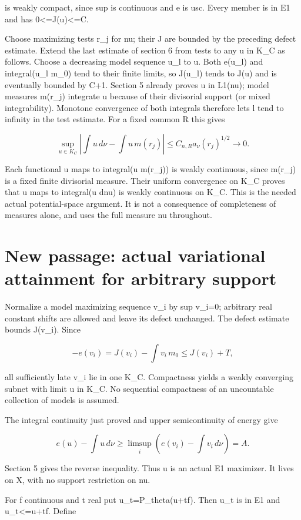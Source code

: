 \documentclass[11pt]{article}
\begin{document}
is weakly compact, since sup is continuous and e is usc. Every member is in E1 and has 0\textless{}=J(u)\textless{}=C.

Choose maximizing tests r\_j for nu; their J are bounded by the preceding defect estimate. Extend the last estimate of section 6 from tests to any u in K\_C as follows. Choose a decreasing model sequence u\_l to u. Both e(u\_l) and integral(u\_l m\_0) tend to their finite limits, so J(u\_l) tends to J(u) and is eventually bounded by C+1. Section 5 already proves u in L1(nu); model measures m(r\_j) integrate u because of their divisorial support (or mixed integrability). Monotone convergence of both integrals therefore lets l tend to infinity in the test estimate. For a fixed common R this gives

\[
\sup_{u\in K_C}\left|\int u\,d\nu-\int u\,m(r_j)\right|
\leq C_{n,R}a_\nu(r_j)^{1/2}\longrightarrow0.
\]

Each functional u maps to integral(u m(r\_j)) is weakly continuous, since m(r\_j) is a fixed finite divisorial measure. Their uniform convergence on K\_C proves that u maps to integral(u dnu) is weakly continuous on K\_C. This is the needed actual potential-space argument. It is not a consequence of completeness of measures alone, and uses the full measure nu throughout.

\section{New passage: actual variational attainment for arbitrary support}

Normalize a model maximizing sequence v\_i by sup v\_i=0; arbitrary real constant shifts are allowed and leave its defect unchanged. The defect estimate bounds J(v\_i). Since

\[
-e(v_i)=J(v_i)-\int v_i\,m_0\leq J(v_i)+T,
\]

all sufficiently late v\_i lie in one K\_C. Compactness yields a weakly converging subnet with limit u in K\_C. No sequential compactness of an uncountable collection of models is assumed.

The integral continuity just proved and upper semicontinuity of energy give

\[
e(u)-\int u\,d\nu\geq
\limsup_i\left(e(v_i)-\int v_i\,d\nu\right)=A.
\]

Section 5 gives the reverse inequality. Thus u is an actual E1 maximizer. It lives on X, with no support restriction on nu.

For f continuous and t real put u\_t=P\_theta(u+tf). Then u\_t is in E1 and u\_t\textless{}=u+tf. Define
\end{document}
